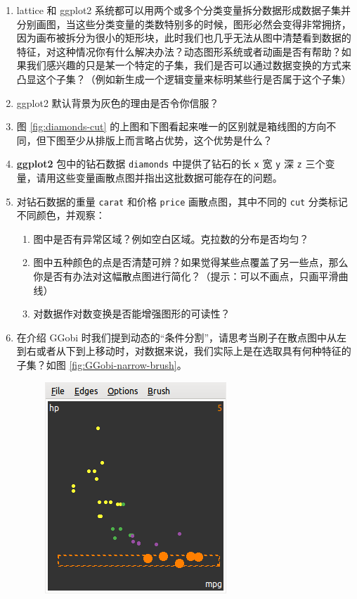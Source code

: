 \documentclass[
  b5paper,
  UTF8,twoside]{book}
\begin{document}
\begin{enumerate}
\def\labelenumi{\arabic{enumi}.}
\item
  lattice 和 ggplot2 系统都可以用两个或多个分类变量拆分数据形成数据子集并分别画图，当这些分类变量的类数特别多的时候，图形必然会变得非常拥挤，因为画布被拆分为很小的矩形块，此时我们也几乎无法从图中清楚看到数据的特征，对这种情况你有什么解决办法？动态图形系统或者动画是否有帮助？如果我们感兴趣的只是某一个特定的子集，我们是否可以通过数据变换的方式来凸显这个子集？（例如新生成一个逻辑变量来标明某些行是否属于这个子集）
\item
  ggplot2 默认背景为灰色的理由是否令你信服？
\item
  图 \ref{fig:diamonds-cut} 的上图和下图看起来唯一的区别就是箱线图的方向不同，但下图至少从排版上而言略占优势，这个优势是什么？
\item
  \textbf{ggplot2} 包中的钻石数据 \texttt{diamonds} 中提供了钻石的长 \texttt{x} 宽 \texttt{y} 深 \texttt{z} 三个变量，请用这些变量画散点图并指出这批数据可能存在的问题。
\item
  对钻石数据的重量 \texttt{carat} 和价格 \texttt{price} 画散点图，其中不同的 \texttt{cut} 分类标记不同颜色，并观察：

  \begin{enumerate}
  \def\labelenumii{(\alph{enumii})}
  \item
    图中是否有异常区域？例如空白区域。克拉数的分布是否均匀？
  \item
    图中五种颜色的点是否清楚可辨？如果觉得某些点覆盖了另一些点，那么你是否有办法对这幅散点图进行简化？（提示：可以不画点，只画平滑曲线）
  \item
    对数据作对数变换是否能增强图形的可读性？
  \end{enumerate}
\item
  在介绍 GGobi 时我们提到动态的``条件分割''，请思考当刷子在散点图中从左到右或者从下到上移动时，对数据来说，我们实际上是在选取具有何种特征的子集？如图 \ref{fig:GGobi-narrow-brush}。

  \begin{figure}

   {\centering \includegraphics{images/GGobi-narrow-brush} 

}
\end{figure}
\end{enumerate}
\end{document}
